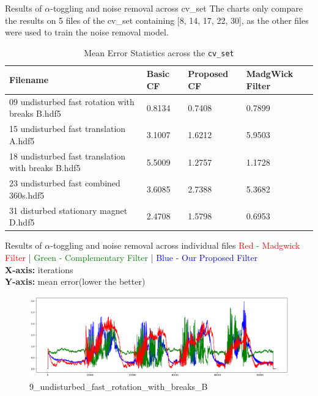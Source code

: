 \documentclass[aspectratio=169,xcolor=dvipsnames]{beamer}
\begin{document}
\begin{frame}{Results of $\alpha$-toggling and noise removal across cv_set}
\small
The charts only compare the results on 5 files of the cv\_set containing [8, 14, 17, 22, 30], as the other files were used to train the noise removal model.
\begin{table}[H]
\centering
\caption{Mean Error Statistics across the \texttt{cv\_set}}
\label{tab:error_statistics_cvset_mean}
    \begin{tabular}{|p{}|p{}|p{}|p{}|}
    \hline
    \textbf{Filename} & \textbf{Basic CF} & \textbf{Proposed CF} & \textbf{ MadgWick Filter} \\
    \hline
    09 undisturbed fast rotation with breaks B.hdf5 & 0.8134 & 0.7408 & 0.7899 \\
    \hline
    15 undisturbed fast translation A.hdf5 & 3.1007 & 1.6212 & 5.9503 \\
    \hline
    18 undisturbed fast translation with breaks B.hdf5 & 5.5009 & 1.2757 & 1.1728 \\
    \hline
    23 undisturbed fast combined 360s.hdf5 & 3.6085 & 2.7388 & 5.3682 \\
    \hline
    31 disturbed stationary magnet D.hdf5 & 2.4708 & 1.5798 & 0.6953 \\
    \hline
    \end{tabular}
\end{table}
    
\end{frame}

\begin{frame}{Results of $\alpha$-toggling and noise removal across individual files}
\small
\textcolor{red}{Red - Madgwick Filter} | \textcolor{green}{Green - Complementary Filter} | \textcolor{blue}{Blue - Our Proposed Filter} \\ 
\textbf{X-axis:} iterations \\ \textbf{Y-axis:} mean error(lower the better)

\begin{figure}
    \centering
    \includegraphics[width=1\linewidth]{logos/9_undisturbed_fast_rotation_with_breaks_B.png}
    \caption{9\_undisturbed\_fast\_rotation\_with\_breaks\_B}
    \label{fig:9_undisturbed_fast_rotation}
\end{figure}
\hfill
\end{frame}
\end{document}
